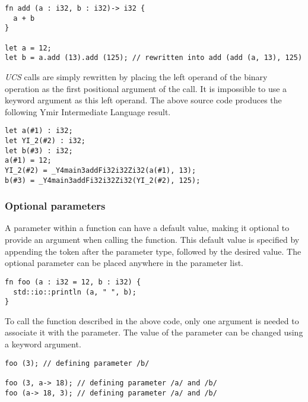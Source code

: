 \begin{lstlisting}[style=coloredverbatim]
fn add (a : i32, b : i32)-> i32 {
  a + b
}

let a = 12;
let b = a.add (13).add (125); // rewritten into add (add (a, 13), 125)
\end{lstlisting}

\textit{UCS} calls are simply rewritten by placing the left operand of the
binary operation  as the first positional argument of the call. It is
impossible to use a keyword argument as this left operand. The above source code
produces the following Ymir Intermediate Language result.
\smallskip

\begin{lstlisting}[style=lyilVerb]
let a(#1) : i32;
let YI_2(#2) : i32;
let b(#3) : i32;
a(#1) = 12;
YI_2(#2) = _Y4main3addFi32i32Zi32(a(#1), 13);
b(#3) = _Y4main3addFi32i32Zi32(YI_2(#2), 125);
\end{lstlisting}


\subsubsection*{Optional parameters}

A parameter within a function can have a default value, making it optional to
provide an argument when calling the function. This default value is specified
by appending the \token{=} token after the parameter type, followed by the
desired value. The optional parameter can be placed anywhere in the parameter
list.
\bigskip

\begin{lstlisting}[style=coloredverbatim]
fn foo (a : i32 = 12, b : i32) {
  std::io::println (a, " ", b);
}
\end{lstlisting}

To call the  function described in the above code, only one argument
is needed to associate it with the  parameter. The value of the
parameter can be changed using a keyword argument.

\begin{lstlisting}[style=coloredverbatim]
foo (3); // defining parameter /b/

foo (3, a-> 18); // defining parameter /a/ and /b/
foo (a-> 18, 3); // defining parameter /a/ and /b/
\end{lstlisting}


